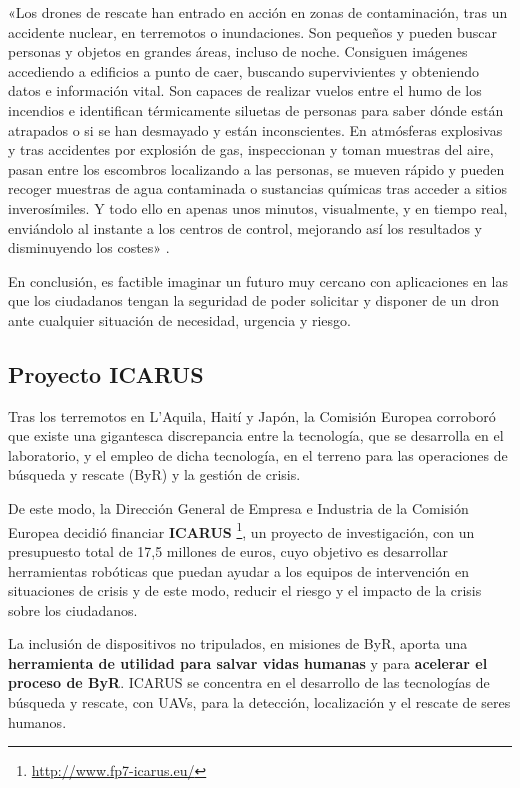 «Los drones de rescate han entrado en acción en zonas de contaminación, tras un accidente nuclear, en terremotos o inundaciones. Son pequeños y pueden buscar personas y objetos en grandes áreas, incluso de noche. Consiguen imágenes accediendo a edificios a punto de caer, buscando supervivientes y obteniendo datos e información vital. Son capaces de realizar vuelos entre el humo de los incendios e identifican térmicamente siluetas de personas para saber dónde están atrapados o si se han desmayado y están inconscientes. En atmósferas explosivas y tras accidentes por explosión de gas, inspeccionan y toman muestras del aire, pasan entre los escombros localizando a las personas, se mueven rápido y pueden recoger muestras de agua contaminada o sustancias químicas tras acceder a sitios inverosímiles. Y todo ello en apenas unos minutos, visualmente, y en tiempo real, enviándolo al instante a los centros de control, mejorando así los resultados y disminuyendo los costes» \cite{dron3}.

\clearpage

En conclusión, es factible imaginar un futuro muy cercano con aplicaciones en las que los ciudadanos tengan la seguridad de poder solicitar y disponer de un dron ante cualquier situación de necesidad, urgencia y riesgo.

\subsection{Proyecto ICARUS}
\label{sec:icarus}

Tras los terremotos en L'Aquila, Haití y Japón, la Comisión Europea corroboró que existe una gigantesca discrepancia entre la tecnología, que se desarrolla en el laboratorio, y el empleo de dicha tecnología, en el terreno para las operaciones de búsqueda y rescate (\acs{ByR}) y la gestión de crisis.

De este modo, la Dirección General de Empresa e Industria de la Comisión Europea decidió financiar \textbf{ICARUS} \footnote{\url{http://www.fp7-icarus.eu/}}, un proyecto de investigación, con un presupuesto total de 17,5 millones de euros, cuyo objetivo es desarrollar herramientas robóticas que puedan ayudar a los equipos de intervención en situaciones de crisis y de este modo, reducir el riesgo y el impacto de la crisis sobre los ciudadanos.

La inclusión de dispositivos no tripulados, en misiones de \acs{ByR}, aporta una \textbf{herramienta de utilidad para salvar vidas humanas} y para \textbf{acelerar el proceso de \acs{ByR}}. ICARUS se concentra en el desarrollo de las tecnologías de búsqueda y rescate, con \acs{UAV}s, para la detección, localización y el rescate de seres humanos.

